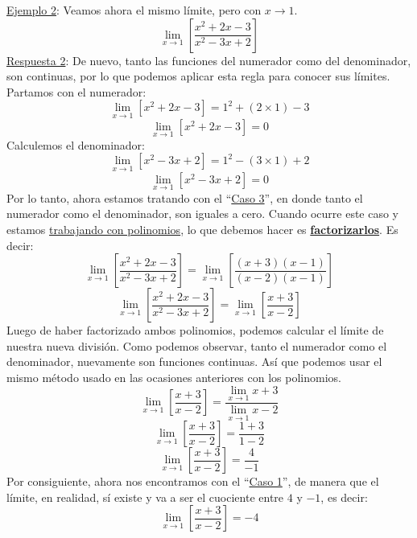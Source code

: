 \documentclass[12pt]{article}
\begin{document}
\underline{Ejemplo 2}: Veamos ahora el mismo límite, pero con $x \to 1$.
\[\lim_{x \to 1} \left[\frac{x^{2} + 2x - 3}{x^{2} - 3x + 2}\right]\]
\underline{Respuesta 2}: De nuevo, tanto las funciones del numerador como del denominador, son continuas, por lo que podemos aplicar esta regla para conocer sus límites. Partamos con el numerador:
\[\lim_{x \to 1} [x^{2} + 2x - 3] = 1^{2} + (2 \times 1) - 3\]
\[\lim_{x \to 1} [x^{2} + 2x - 3] = 0\]
Calculemos el denominador:
\[\lim_{x \to 1} [x^{2} - 3x + 2] = 1^{2} - (3 \times 1) + 2\]
\[\lim_{x \to 1} [x^{2} - 3x + 2] = 0\]
Por lo tanto, ahora estamos tratando con el ``\underline{Caso 3}'', en donde tanto el numerador como el denominador, son iguales a cero. Cuando ocurre este caso y estamos \underline{trabajando con polinomios}, lo que debemos hacer es \textbf{\underline{factorizarlos}}. Es decir:
\[\lim_{x \to 1} \left[\frac{x^{2} + 2x - 3}{x^{2} - 3x + 2}\right] = \lim_{x \to 1} \left[\frac{(x + 3)(x - 1)}{(x - 2)(x - 1)}\right]\]
\[\lim_{x \to 1} \left[\frac{x^{2} + 2x - 3}{x^{2} - 3x + 2}\right] = \lim_{x \to 1} \left[\frac{x + 3}{x - 2}\right]\]
Luego de haber factorizado ambos polinomios, podemos calcular el límite de nuestra nueva división. Como podemos observar, tanto el numerador como el denominador, nuevamente son funciones continuas. Así que podemos usar el mismo método usado en las ocasiones anteriores con los polinomios.
\[\lim_{x \to 1} \left[\frac{x + 3}{x - 2}\right] = \frac{\lim_{x \to 1} x + 3}{\lim_{x \to 1} x - 2}\]
\[\lim_{x \to 1} \left[\frac{x + 3}{x - 2}\right] = \frac{1 + 3}{1 - 2}\]
\[\lim_{x \to 1} \left[\frac{x + 3}{x - 2}\right] = \frac{4}{-1}\]
Por consiguiente, ahora nos encontramos con el ``\underline{Caso 1}'', de manera que el límite, en realidad, sí existe y va a ser el cuociente entre $4$ y $-1$, es decir:
\[\lim_{x \to 1} \left[\frac{x + 3}{x - 2}\right] = -4\]
\end{document}
